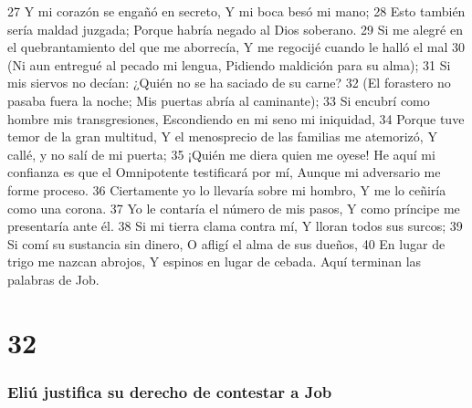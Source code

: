 27 Y mi corazón se engañó en secreto,  
Y mi boca besó mi mano;  
28 Esto también sería maldad juzgada;  
Porque habría negado al Dios soberano.  
29 Si me alegré en el quebrantamiento del que me aborrecía,  
Y me regocijé cuando le halló el mal  
30 (Ni aun entregué al pecado mi lengua,  
Pidiendo maldición para su alma);  
31 Si mis siervos no decían:  
¿Quién no se ha saciado de su carne?  
32 (El forastero no pasaba fuera la noche;  
Mis puertas abría al caminante);  
33 Si encubrí como hombre mis transgresiones,  
Escondiendo en mi seno mi iniquidad,  
34 Porque tuve temor de la gran multitud,  
Y el menosprecio de las familias me atemorizó,  
Y callé, y no salí de mi puerta;  
35 ¡Quién me diera quien me oyese!  
He aquí mi confianza es que el Omnipotente testificará por mí,  
Aunque mi adversario me forme proceso.  
36 Ciertamente yo lo llevaría sobre mi hombro,  
Y me lo ceñiría como una corona.  
37 Yo le contaría el número de mis pasos,  
Y como príncipe me presentaría ante él.  
38 Si mi tierra clama contra mí,  
Y lloran todos sus surcos;  
39 Si comí su sustancia sin dinero,  
O afligí el alma de sus dueños,  
40 En lugar de trigo me nazcan abrojos,  
Y espinos en lugar de cebada.  
Aquí terminan las palabras de Job.  

\chapter{32}

\subsection*{Eliú justifica su derecho de contestar a Job}  

